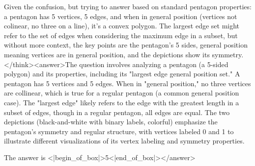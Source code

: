 Given the confusion, but trying to answer based on standard pentagon properties: a pentagon has 5 vertices, 5 edges, and when in general position (vertices not colinear, no three on a line), it's a convex polygon. The largest edge set might refer to the set of edges when considering the maximum edge in a subset, but without more context, the key points are the pentagon's 5 sides, general position meaning vertices are in general position, and the depictions show its symmetry.</think><answer>The question involves analyzing a pentagon (a 5-sided polygon) and its properties, including its "largest edge general position set." A pentagon has 5 vertices and 5 edges. When in "general position," no three vertices are collinear, which is true for a regular pentagon (a common general position case). The "largest edge" likely refers to the edge with the greatest length in a subset of edges, though in a regular pentagon, all edges are equal. The two depictions (black-and-white with binary labels, colorful) emphasize the pentagon’s symmetry and regular structure, with vertices labeled 0 and 1 to illustrate different visualizations of its vertex labeling and symmetry properties.  

The answer is <|begin_of_box|>5<|end_of_box|></answer>